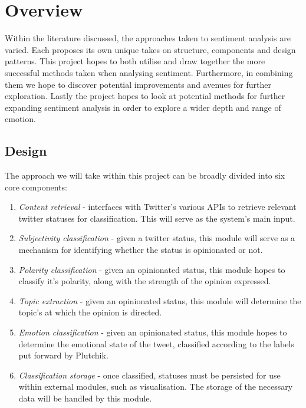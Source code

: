 \chapter{Overview}
\label{Overview}

Within the literature discussed, the approaches taken to sentiment analysis are varied. Each proposes its own unique takes on structure, components and design patterns. This project hopes to both utilise and draw together the more successful methods taken when analysing sentiment. Furthermore, in combining them we hope to discover potential improvements and avenues for further exploration. Lastly the project hopes to look at potential methods for further expanding sentiment analysis in order to explore a wider depth and range of emotion.

\section{Design}

The approach we will take within this project can be broadly divided into six core components:

\begin{enumerate}
	\item \emph{Content retrieval} - interfaces with Twitter's various APIs to retrieve relevant twitter statuses for classification. This will serve as the system's main input.
	\item \emph{Subjectivity classification} - given a twitter status, this module will serve as a mechanism for identifying whether the status is opinionated or not.
	\item \emph{Polarity classification} - given an opinionated status, this module hopes to classify it's polarity, along with the strength of the opinion expressed.
	\item \emph{Topic extraction} - given an opinionated status, this module will determine the topic's at which the opinion is directed.
	\item \emph{Emotion classification} - given an opinionated status, this module hopes to determine the emotional state of the tweet, classified according to the labels put forward by Plutchik.
	\item \emph{Classification storage} - once classified, statuses must be persisted for use within external modules, such as visualisation. The storage of the necessary data will be handled by this module.
\end{enumerate}

